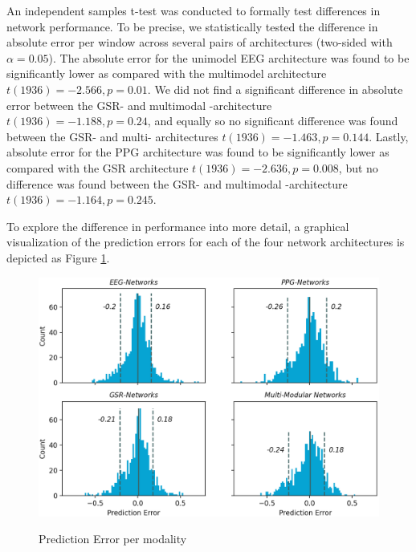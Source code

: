\documentclass[12pt]{article}
\begin{document}
An independent samples t-test was conducted to formally test differences in network performance. To be precise, we statistically tested the difference in absolute error per window across several pairs of architectures (two-sided with $\alpha = 0.05$).  The absolute error for the unimodel EEG architecture was found to be significantly lower as compared with the multimodel architecture $t(1936)=-2.566, p=0.01$. We did not find a significant difference in absolute error between the GSR- and multimodal -architecture $t(1936)=-1.188, p=0.24$, and equally so no significant difference was found between the GSR- and multi- architectures $t(1936)=-1.463, p = 0.144$. Lastly, absolute error for the PPG architecture was found to be significantly lower as compared with the GSR architecture $t(1936)=-2.636 , p = 0.008$, but no difference was found between the GSR- and multimodal -architecture $t(1936)=-1.164 , p = 0.245$.

To explore the difference in performance into more detail, a graphical visualization of the prediction errors for each of the four network architectures is depicted as Figure \ref{fig:mae_hist}.  

\vspace{0.2cm}
\begin{figure}[h]
\caption{Prediction Error per modality}
\bigskip
\includegraphics[scale=0.44]{error_hist.png}
\label{fig:mae_hist}
\end{figure}
\end{document}
